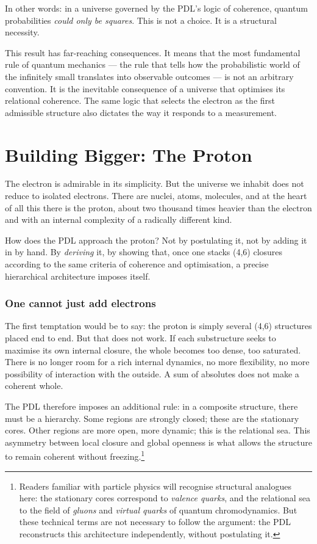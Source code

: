 \documentclass[11pt, a4paper, openright]{book}
\begin{document}
In other words: in a universe governed by the PDL’s logic of coherence, quantum probabilities \emph{could only be squares}. This is not a choice. It is a structural necessity.

\medskip

This result has far-reaching consequences. It means that the most fundamental rule of quantum mechanics — the rule that tells how the probabilistic world of the infinitely small translates into observable outcomes — is not an arbitrary convention. It is the inevitable consequence of a universe that optimises its relational coherence. The same logic that selects the electron as the first admissible structure also dictates the way it responds to a measurement.

\chapter{Building Bigger: The Proton}

The electron is admirable in its simplicity. But the universe we inhabit does not reduce to isolated electrons. There are nuclei, atoms, molecules, and at the heart of all this there is the proton, about two thousand times heavier than the electron and with an internal complexity of a radically different kind.

\medskip

How does the PDL approach the proton? Not by postulating it, not by adding it in by hand. By \emph{deriving} it, by showing that, once one stacks (4,6) closures according to the same criteria of coherence and optimisation, a precise hierarchical architecture imposes itself.

\subsection*{One cannot just add electrons}

The first temptation would be to say: the proton is simply several (4,6) structures placed end to end. But that does not work. If each substructure seeks to maximise its own internal closure, the whole becomes too dense, too saturated. There is no longer room for a rich internal dynamics, no more flexibility, no more possibility of interaction with the outside. A sum of absolutes does not make a coherent whole.

\medskip

The PDL therefore imposes an additional rule: in a composite structure, there must be a hierarchy. Some regions are strongly closed; these are the stationary cores. Other regions are more open, more dynamic; this is the relational sea. This asymmetry between local closure and global openness is what allows the structure to remain coherent without freezing.\footnote{%
  Readers familiar with particle physics will recognise structural analogues here: the stationary cores correspond to \emph{valence quarks}, and the relational sea to the field of \emph{gluons} and \emph{virtual quarks} of quantum chromodynamics. But these technical terms are not necessary to follow the argument: the PDL reconstructs this architecture independently, without postulating it.}
\end{document}
